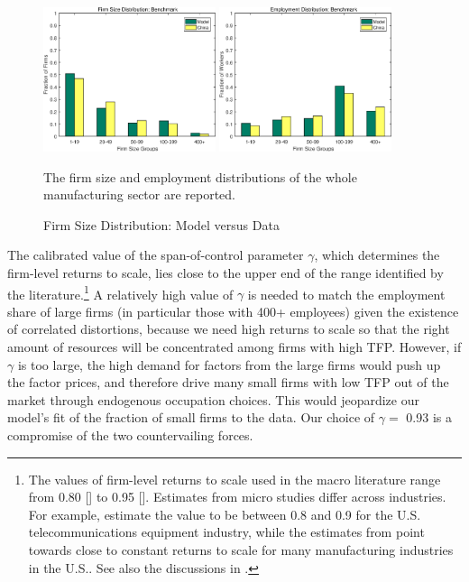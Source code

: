 \documentclass[AEJ]{AEA}
\begin{document}
\begin{figure}[t]
    \begin{center}
    \includegraphics[width=0.45\textwidth]{./Figures/benchfit_fs.eps}
    \includegraphics[width=0.45\textwidth]{./Figures/benchfit_es.eps}
    \caption{Firm Size Distribution: Model versus Data}
    \begin{figurenotes}
        The firm size and employment distributions of the whole manufacturing sector are reported.
    \end{figurenotes}
    \label{fig:fitness}
    \end{center}
\end{figure}

The calibrated value of the span-of-control parameter $\gamma$, which determines the firm-level returns to scale, lies close to the upper end of the range identified by the literature.\footnote{The values of firm-level returns to scale used in the macro literature range from 0.80 [\citet{Guneretal:2008}] to 0.95 [\citet{Bartelsmanetal:2013}]. Estimates from micro studies differ across industries. For example, \citet{OlleyPakes:1996} estimate the value to be between 0.8 and 0.9 for the U.S. telecommunications equipment industry, while the estimates from \citet{Bailyetal:1992} point towards close to constant returns to scale for many manufacturing industries in the U.S.. See also the discussions in \citet{AtkesonKehoe:2005}.} A relatively high value of $\gamma$ is needed to match the employment share of large firms (in particular those with 400+ employees) given the existence of correlated distortions, because we need high returns to scale so that the right amount of resources will be concentrated among firms with high TFP. However, if $\gamma$ is too large, the high demand for factors from the large firms would push up the factor prices, and therefore drive many small firms with low TFP out of the market through endogenous occupation choices. This would jeopardize our model's fit of the fraction of small firms to the data. Our choice of $\gamma =$ 0.93 is a compromise of the two countervailing forces.
\end{document}
